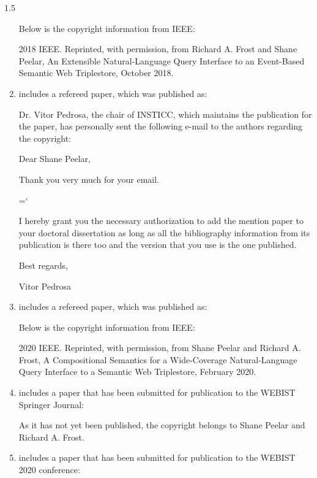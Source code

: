 \documentclass[fleqn, oneside, 12pt]{book}
\theoremstyle{definitionsty}
\newcommand{\uwinonehalfspacelen}{1.5}
\newcommand{\uwindefaultspacelen}{\uwinonehalfspacelen}
\newenvironment{uwindefaultspaceenv}%
{\begin{spacing}{\uwindefaultspacelen}}%
	{\end{spacing}}
\begin{document}
\begin{uwindefaultspaceenv}
\begin{enumerate}
{	

	Below is the copyright information from IEEE:

	2018 IEEE. Reprinted, with permission, from Richard A. Frost and Shane Peelar, An Extensible Natural-Language Query Interface to an Event-Based Semantic Web Triplestore, October 2018.}

	\item { includes a refereed paper, which was published as:


	Dr. Vitor Pedrosa, the chair of INSTICC, which maintains the publication for the paper, has personally sent the following e-mail to the authors regarding the copyright:


		{ \ttfamily
		Dear Shane Peelar,


		Thank you very much for your email.


		\hyphenchar\font=`\-%

		I hereby grant you the necessary authorization to add the mention
		paper to your doctoral dissertation as long as all the bibliography
		information from its publication is there too and the version
		that you use is the one published.


		Best regards,


		Vitor Pedrosa
		}

	}

	\item { includes a refereed paper, which was published as:


		Below is the copyright information from IEEE:

		2020 IEEE. Reprinted, with permission, from Shane Peelar and Richard A. Frost, A Compositional Semantics for a Wide-Coverage Natural-Language Query Interface to a Semantic Web Triplestore, February 2020.}

	\item { includes a paper that has been submitted for publication to the WEBIST Springer Journal:


    As it has not yet been published, the copyright belongs to Shane Peelar and Richard A. Frost.
    }

	\item { includes a paper that has been submitted for publication to the WEBIST 2020 conference:

}
\end{enumerate}
\end{uwindefaultspaceenv}
\end{document}
